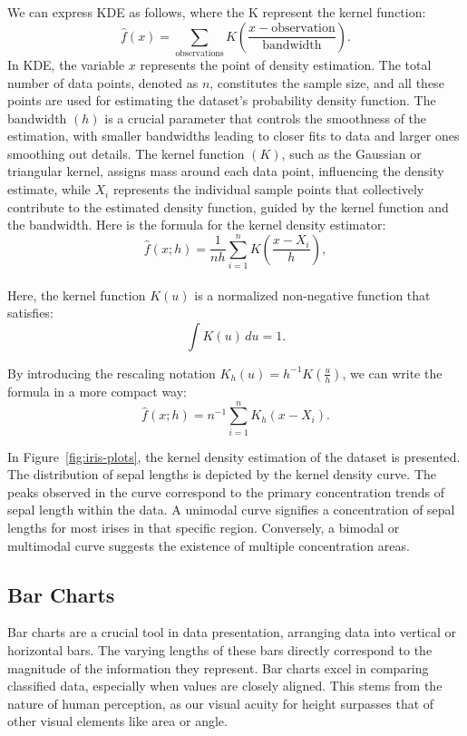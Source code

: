 \documentclass{article}\usepackage[]{graphicx}\usepackage[]{xcolor}
\numberwithin{equation}{section}
\begin{document}
\noindent
We can express KDE as follows, where the K represent the kernel function:
$$\hat{f}(x) = \sum_{\text{observations}} K\left(\frac{x - \text{observation}}{\text{bandwidth}}\right).$$
In KDE, the variable $x$ represents the point of density estimation. The total number of data points, denoted as $n$, constitutes the sample size, and all these points are used for estimating the dataset's probability density function. The bandwidth $(h)$ is a crucial parameter that controls the smoothness of the estimation, with smaller bandwidths leading to closer fits to data and larger ones smoothing out details. The kernel function $(K)$, such as the Gaussian or triangular kernel, assigns mass around each data point, influencing the density estimate, while $X_i$ represents the individual sample points that collectively contribute to the estimated density function, guided by the kernel function and the bandwidth\cite{wand1994kernel}. Here is the formula for the kernel density estimator:
$$\hat{f}(x; h) = \frac{1}{nh} \sum_{i=1}^{n} K\left(\frac{x - X_i}{h}\right),$$\\
Here, the kernel function \( K(u) \) is a normalized non-negative function that satisfies:
$$ \int K(u) \, du = 1. $$

\noindent
By introducing the rescaling notation $K_h(u) = h^{-1}K(\frac{u}{h})$, we can write the formula in a more compact way:
$$\hat{f}(x; h) = n^{-1} \sum_{i=1}^{n} K_h(x - X_i).$$

\noindent In Figure~\ref{fig:iris-plots}, the kernel density estimation of the dataset is presented. The distribution of sepal lengths is depicted by the kernel density curve. The peaks observed in the curve correspond to the primary concentration trends of sepal length within the data. A unimodal curve signifies a concentration of sepal lengths for most irises in that specific region. Conversely, a bimodal or multimodal curve suggests the existence of multiple concentration areas.

\subsection{Bar Charts}
\noindent Bar charts are a crucial tool in data presentation, arranging data into vertical or horizontal bars. The varying lengths of these bars directly correspond to the magnitude of the information they represent. Bar charts excel in comparing classified data, especially when values are closely aligned. This stems from the nature of human perception, as our visual acuity for height surpasses that of other visual elements like area or angle.\\
\end{document}

